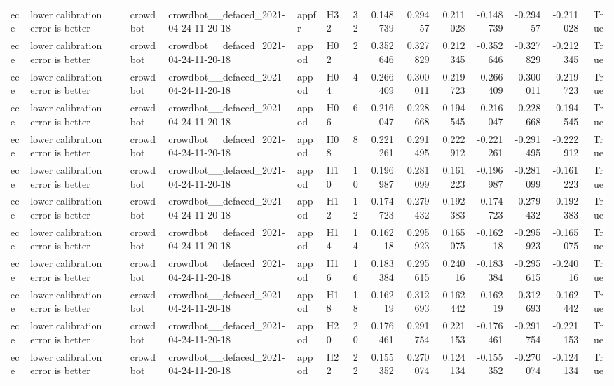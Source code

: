 \begin{longtable}{llllllrrrrrrrr}
ece & lower calibration error is better & crowdbot & crowdbot\_\_defaced\_2021-04-24-11-20-18 & appfr & H32 & 32 & 0.148739 & 0.29457 & 0.211028 & -0.148739 & -0.29457 & -0.211028 & True \\
ece & lower calibration error is better & crowdbot & crowdbot\_\_defaced\_2021-04-24-11-20-18 & appod & H02 & 2 & 0.352646 & 0.327829 & 0.212345 & -0.352646 & -0.327829 & -0.212345 & True \\
ece & lower calibration error is better & crowdbot & crowdbot\_\_defaced\_2021-04-24-11-20-18 & appod & H04 & 4 & 0.266409 & 0.300011 & 0.219723 & -0.266409 & -0.300011 & -0.219723 & True \\
ece & lower calibration error is better & crowdbot & crowdbot\_\_defaced\_2021-04-24-11-20-18 & appod & H06 & 6 & 0.216047 & 0.228668 & 0.194545 & -0.216047 & -0.228668 & -0.194545 & True \\
ece & lower calibration error is better & crowdbot & crowdbot\_\_defaced\_2021-04-24-11-20-18 & appod & H08 & 8 & 0.221261 & 0.291495 & 0.222912 & -0.221261 & -0.291495 & -0.222912 & True \\
ece & lower calibration error is better & crowdbot & crowdbot\_\_defaced\_2021-04-24-11-20-18 & appod & H10 & 10 & 0.196987 & 0.281099 & 0.161223 & -0.196987 & -0.281099 & -0.161223 & True \\
ece & lower calibration error is better & crowdbot & crowdbot\_\_defaced\_2021-04-24-11-20-18 & appod & H12 & 12 & 0.174723 & 0.279432 & 0.192383 & -0.174723 & -0.279432 & -0.192383 & True \\
ece & lower calibration error is better & crowdbot & crowdbot\_\_defaced\_2021-04-24-11-20-18 & appod & H14 & 14 & 0.16218 & 0.295923 & 0.165075 & -0.16218 & -0.295923 & -0.165075 & True \\
ece & lower calibration error is better & crowdbot & crowdbot\_\_defaced\_2021-04-24-11-20-18 & appod & H16 & 16 & 0.183384 & 0.295615 & 0.24016 & -0.183384 & -0.295615 & -0.24016 & True \\
ece & lower calibration error is better & crowdbot & crowdbot\_\_defaced\_2021-04-24-11-20-18 & appod & H18 & 18 & 0.16219 & 0.312693 & 0.162442 & -0.16219 & -0.312693 & -0.162442 & True \\
ece & lower calibration error is better & crowdbot & crowdbot\_\_defaced\_2021-04-24-11-20-18 & appod & H20 & 20 & 0.176461 & 0.291754 & 0.221153 & -0.176461 & -0.291754 & -0.221153 & True \\
ece & lower calibration error is better & crowdbot & crowdbot\_\_defaced\_2021-04-24-11-20-18 & appod & H22 & 22 & 0.155352 & 0.270074 & 0.124134 & -0.155352 & -0.270074 & -0.124134 & True \\

\end{longtable}
